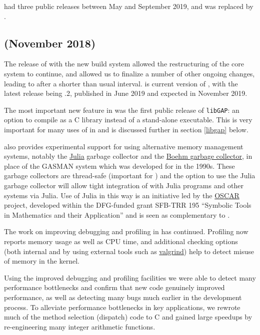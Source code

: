 \documentclass{deliverablereport}
\begin{document}
 had three public releases between May and September 2019, and
was replaced by .

\subsection{ (November 2018)}\label{gap-4.10}

The release of  with the new build system allowed the
restructuring of the core \GAP system to continue, and allowed us to
finalize a number of other ongoing changes, leading to 
after a shorter than usual interval.  is current
version of \GAP, with the latest release being .2, published
in June 2019 and  expected in November 2019.

The most important new feature in  was the first public
release of \texttt{libGAP}: an
option to compile \GAP as a C library instead of a stand-alone
executable. This is very important for many uses of \GAP in \ODK and
is discussed further in section \ref{libgap} below.

 also provides experimental support for using alternative
memory management systems, notably the \href{??}{Julia} garbage
collector and the \href{???}{Boehm garbage collector}, in place of the
GASMAN system which was developed for  in the 1990s.  These
garbage collectors are thread-safe (important for \HPCGAP) and the
option to use the Julia garbage collector will allow tight integration
of \GAP with Julia programs and other systems via Julia. Use of Julia
in this way is an initiative led by the
\href{https://oscar.computeralgebra.de/}{OSCAR} project, developed
within the DFG-funded grant SFB-TRR 195 ``Symbolic Tools in
Mathematics and their Application'' and is seen as complementary to \ODK.

The work on improving debugging and profiling in \GAP has
continued. Profiling now reports memory usage as well as CPU time, and
additional checking options (both internal and by using external tools such as
\href{???}{valgrind}) help to detect misuse of memory in the kernel.

Using the improved debugging and profiling facilities we were able to
detect many performance bottlenecks and confirm that new code
genuinely improved performance, as well as detecting many bugs much
earlier in the development process. To alleviate performance
bottlenecks in key applications, we rewrote much of the method
selection (dispatch) code \GAP to C and gained large speedups by
re-engineering many integer arithmetic functions.
\end{document}
